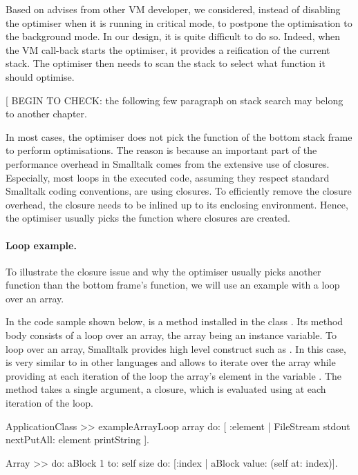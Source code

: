 \documentclass[a4paper,12pt,twoside]{../includes/ThesisStyle}
\begin{document}
Based on advises from other VM developer, we considered, instead of disabling the optimiser when it is running in critical mode, to postpone the optimisation to the background mode. In our design, it is quite difficult to do so. Indeed, when the VM call-back starts the optimiser, it provides a reification of the current stack. The optimiser then needs to scan the stack to select what function it should optimise. 


[ BEGIN TO CHECK: the following few paragraph on stack search may belong to another chapter.

In most cases, the optimiser does not pick the function of the bottom stack frame to perform optimisations. The reason is because an important part of the performance overhead in Smalltalk comes from the extensive use of closures. Especially, most loops in the executed code, assuming they respect standard Smalltalk coding conventions, are using closures. To efficiently remove the closure overhead, the closure needs to be inlined up to its enclosing environment. Hence, the optimiser usually picks the function where closures are created. 

\paragraph{Loop example.} To illustrate the closure issue and why the optimiser usually picks another function than the bottom frame's function, we will use an example with a loop over an array. 

In the code sample shown below,  is a method installed in the class . Its method body consists of a loop over an array, the array being an instance variable. To loop over an array, Smalltalk provides high level construct such as . In this case,  is very similar to  in other languages and allows to iterate over the array while providing at each iteration of the loop the array's element in the variable . The  method takes a single argument, a closure, which is evaluated using  at each iteration of the loop.

\begin{code}
	ApplicationClass >> exampleArrayLoop
	    array do: [ :element | FileStream stdout nextPutAll: element printString ].
		
	Array >> do: aBlock
	    1 to: self size do: [:index | aBlock value: (self at: index)].
\end{code}
\end{document}

